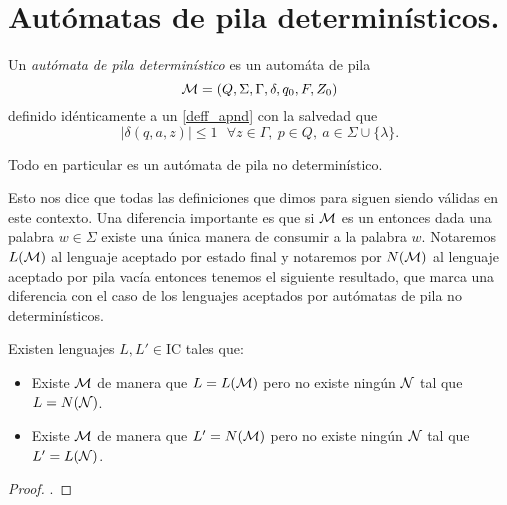 \documentclass[tesis.tex]{subfiles}
\begin{document}
\section{Autómatas de pila determinísticos.} 
\begin{deff}
	Un \emph{autómata de pila determinístico} es un automáta de pila 
	\[
	{\cal M } = (Q, \Sigma, \Gamma, \delta, q_0, F, Z_0)
	\]
	definido idénticamente a un \APND \ref{deff_apnd} con la salvedad que 
	\[
	|\delta(q,a, z)| \le 1 \ \ \ \forall z \in \Gamma, \ p \in Q, \ a \in \Sigma \cup \{ \lambda \}.
	\]
\end{deff}

\begin{obs}
	Todo \APD en particular es un autómata de pila no determinístico. 
\end{obs}

Esto nos dice que todas las definiciones que dimos para \APND siguen siendo válidas en este contexto.
Una diferencia importante es que si ${\cal M }$ es un \APD entonces dada una palabra $w \in \Sigma$ existe una única manera de consumir a la palabra $w$.
Notaremos $L(\cal M)$ al lenguaje aceptado por estado final y notaremos por $N(\cal M)$ al lenguaje aceptado por pila vacía entonces tenemos el siguiente resultado, que marca una diferencia con el caso de los lenguajes aceptados por autómatas de pila no determinísticos.

\begin{teo}
	Existen lenguajes $L, L' \in \text{IC}$ tales que:
	\begin{itemize}
		\item Existe $\cal M$ \APD de manera que $L = L(\cal M)$ pero no existe ningún $\cal N$ \APD tal que $L = N(\cal N)$.
		\item Existe $\cal M$ \APD de manera que $L' = N(\cal M)$ pero no existe ningún $\cal N$ \APD tal que $L' = L(\cal N)$.
	\end{itemize} 
\end{teo}
\begin{proof}
	\cite{sipser13}.
\end{proof}
\end{document}
